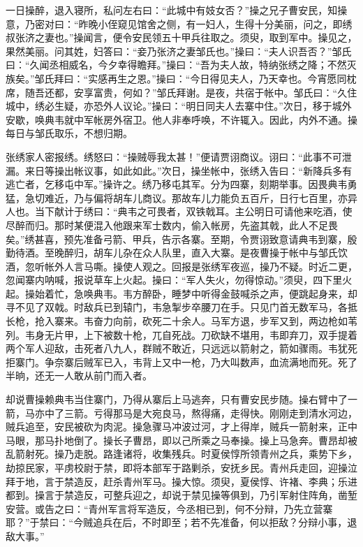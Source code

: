 一日操醉，退入寝所，私问左右曰：“此城中有妓女否？”操之兄子曹安民，知操意，乃密对曰：“昨晚小侄窥见馆舍之侧，有一妇人，生得十分美丽，问之，即绣叔张济之妻也。”操闻言，便令安民领五十甲兵往取之。须臾，取到军中。操见之，果然美丽。问其姓，妇答曰：“妾乃张济之妻邹氏也。”操曰：“夫人识吾否？”邹氏曰：“久闻丞相威名，今夕幸得瞻拜。”操曰：“吾为夫人故，特纳张绣之降；不然灭族矣。”邹氏拜曰：“实感再生之恩。”操曰：“今日得见夫人，乃天幸也。今宵愿同枕席，随吾还都，安享富贵，何如？”邹氏拜谢。是夜，共宿于帐中。邹氏曰：“久住城中，绣必生疑，亦恐外人议论。”操曰：“明日同夫人去寨中住。”次日，移于城外安歇，唤典韦就中军帐房外宿卫。他人非奉呼唤，不许辄入。因此，内外不通。操每日与邹氏取乐，不想归期。

张绣家人密报绣。绣怒曰：“操贼辱我太甚！”便请贾诩商议。诩曰：“此事不可泄漏。来日等操出帐议事，如此如此。”次日，操坐帐中，张绣入告曰：“新降兵多有逃亡者，乞移屯中军。”操许之。绣乃移屯其军。分为四寨，刻期举事。因畏典韦勇猛，急切难近，乃与偏将胡车儿商议。那故车儿力能负五百斤，日行七百里，亦异人也。当下献计于绣曰：“典韦之可畏者，双铁戟耳。主公明日可请他来吃酒，使尽醉而归。那时某便混入他跟来军士数内，偷入帐房，先盗其戟，此人不足畏矣。”绣甚喜，预先准备弓箭、甲兵，告示各寨。至期，令贾诩致意请典韦到寨，殷勤待酒。至晚醉归，胡车儿杂在众人队里，直入大寨。是夜曹操于帐中与邹氏饮酒，忽听帐外人言马嘶。操使人观之。回报是张绣军夜巡，操乃不疑。时近二更，忽闻寨内呐喊，报说草车上火起。操曰：“军人失火，勿得惊动。”须臾，四下里火起。操始着忙，急唤典韦。韦方醉卧，睡梦中听得金鼓喊杀之声，便跳起身来，却寻不见了双戟。时敌兵已到辕门，韦急掣步卒腰刀在手。只见门首无数军马，各抵长枪，抢入寨来。韦奋力向前，砍死二十余人。马军方退，步军又到，两边枪如苇列。韦身无片甲，上下被数十枪，兀自死战。刀砍缺不堪用，韦即弃刀，双手提着两个军人迎敌，击死者八九人，群贼不敢近，只远远以箭射之，箭如骤雨。韦犹死拒寨门。争奈寨后贼军已入，韦背上又中一枪，乃大叫数声，血流满地而死。死了半晌，还无一人敢从前门而入者。

却说曹操赖典韦当住寨门，乃得从寨后上马逃奔，只有曹安民步随。操右臂中了一箭，马亦中了三箭。亏得那马是大宛良马，熬得痛，走得快。刚刚走到清水河边，贼兵追至，安民被砍为肉泥。操急骤马冲波过河，才上得岸，贼兵一箭射来，正中马眼，那马扑地倒了。操长子曹昂，即以己所乘之马奉操。操上马急奔。曹昂却被乱箭射死。操乃走脱。路逢诸将，收集残兵。时夏侯惇所领青州之兵，乘势下乡，劫掠民家，平虏校尉于禁，即将本部军于路剿杀，安抚乡民。青州兵走回，迎操泣拜于地，言于禁造反，赶杀青州军马。操大惊。须臾，夏侯惇、许褚、李典；乐进都到。操言于禁造反，可整兵迎之，却说于禁见操等俱到，乃引军射住阵角，凿堑安营。或告之曰：“青州军言将军造反，今丞相已到，何不分辩，乃先立营寨耶？”于禁曰：“今贼追兵在后，不时即至；若不先准备，何以拒敌？分辩小事，退敌大事。”

